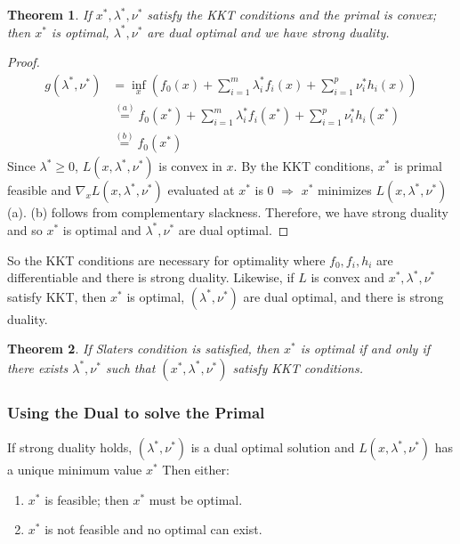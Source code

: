 \documentclass[]{article}
\theoremstyle{mattstyle}
\newtheorem{theorem}{Theorem}[section]
\theoremstyle{definition}
\begin{document}
\begin{theorem}
	If $x^*, \lambda^*, \nu^*$ satisfy the KKT conditions and the primal is convex; then $x^*$ is optimal, $\lambda^*, \nu^*$ are dual optimal and we have strong duality.
\end{theorem}
\begin{proof}
		\begin{align}
		g(\lambda^*, \nu^*) &= \inf_x \left( f_0(x) + \sum_{i=1}^m \lambda_i^*f_i(x) + \sum_{i=1}^p \nu_i^* h_i(x) \right) \\
		&\overset{(a)}{=}f_0(x^*) + \sum_{i=1}^m \lambda_i^*f_i(x^*) + \sum_{i=1}^p \nu_i^* h_i(x^*)\\
		&\overset{(b)}{=}f_0(x^*)
		\end{align}
	 Since $\lambda^*\ge0$, $L(x,\lambda^*,\nu^*)$ is convex in $x$. By the KKT conditions, $x^*$ is primal feasible and $\nabla_x L(x,\lambda^*,\nu^*)$ evaluated at $x^*$ is 0 $\Rightarrow$ $x^*$ minimizes $L(x,\lambda^*,\nu^*)$ (a). (b) follows from complementary slackness. Therefore, we have strong duality and so $x^*$ is optimal and $\lambda^*, \nu^*$ are dual optimal.
\end{proof}

So the KKT conditions are necessary for optimality where $f_0,f_i,h_i$ are differentiable and there is strong duality. Likewise, if $L$ is convex and $x^*,\lambda^*,\nu^*$ satisfy KKT, then $x^*$ is optimal, $(\lambda^*,\nu^*)$ are dual optimal, and there is strong duality.

\begin{theorem}
	If Slaters condition is satisfied, then $x^*$ is optimal if and only if there exists $\lambda^*, \nu^*$ such that $(x^*,\lambda^*, \nu^*)$ satisfy KKT conditions.
\end{theorem}

\subsubsection{Using the Dual to solve the Primal}

If strong duality holds, $(\lambda^*, \nu^*)$ is a dual optimal solution and $L(x, \lambda^*, \nu^*)$ has a unique minimum value $x^*$ Then either:
\begin{enumerate}
	\item $x^*$ is feasible; then $x^*$ must be optimal.
	\item $x^*$ is not feasible and no optimal can exist.
\end{enumerate}
\end{document}

